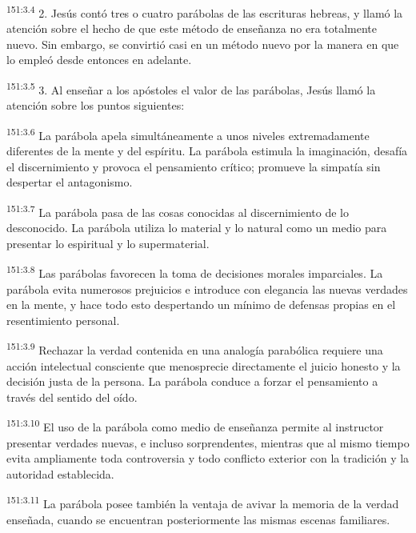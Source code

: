 \par
\textsuperscript{151:3.4} 2. Jesús contó tres o cuatro parábolas de las escrituras hebreas, y llamó la atención sobre el hecho de que este método de enseñanza no era totalmente nuevo. Sin embargo, se convirtió casi en un método nuevo por la manera en que lo empleó desde entonces en adelante.

\par
\textsuperscript{151:3.5} 3. Al enseñar a los apóstoles el valor de las parábolas, Jesús llamó la atención sobre los puntos siguientes:

\par
\textsuperscript{151:3.6} La parábola apela simultáneamente a unos niveles extremadamente diferentes de la mente y del espíritu. La parábola estimula la imaginación, desafía el discernimiento y provoca el pensamiento crítico; promueve la simpatía sin despertar el antagonismo.

\par
\textsuperscript{151:3.7} La parábola pasa de las cosas conocidas al discernimiento de lo desconocido. La parábola utiliza lo material y lo natural como un medio para presentar lo espiritual y lo supermaterial.

\par
\textsuperscript{151:3.8} Las parábolas favorecen la toma de decisiones morales imparciales. La parábola evita numerosos prejuicios e introduce con elegancia las nuevas verdades en la mente, y hace todo esto despertando un mínimo de defensas propias en el resentimiento personal.

\par
\textsuperscript{151:3.9} Rechazar la verdad contenida en una analogía parabólica requiere una acción intelectual consciente que menosprecie directamente el juicio honesto y la decisión justa de la persona. La parábola conduce a forzar el pensamiento a través del sentido del oído.

\par
\textsuperscript{151:3.10} El uso de la parábola como medio de enseñanza permite al instructor presentar verdades nuevas, e incluso sorprendentes, mientras que al mismo tiempo evita ampliamente toda controversia y todo conflicto exterior con la tradición y la autoridad establecida.

\par
\textsuperscript{151:3.11} La parábola posee también la ventaja de avivar la memoria de la verdad enseñada, cuando se encuentran posteriormente las mismas escenas familiares.

